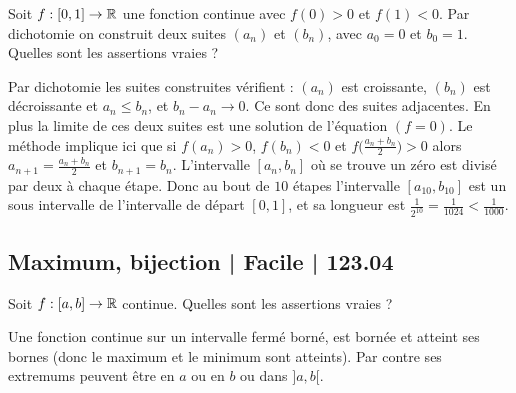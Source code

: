 \begin{question}
Soit $f : [0,1] \to \mathbb{R}$ une fonction continue avec $f(0)>0$ et $f(1)<0$.
Par dichotomie on construit deux suites $(a_n)$ et $(b_n)$, avec $a_0 = 0$ et $b_0 = 1$. Quelles sont les assertions vraies ?
\begin{answers}



    
\end{answers}
\begin{explanations}
Par dichotomie les suites construites vérifient : $(a_n)$ est croissante, $(b_n)$ est décroissante et $a_n \le b_n$, et $b_n-a_n \to 0$. Ce sont donc des suites adjacentes. En plus la limite de ces deux suites est une solution de l'équation $(f=0)$.
Le méthode implique ici que si $f(a_n)>0$, $f(b_n)<0$ et $f\big(\frac{a_n+b_n}{2}\big) >0$ alors $a_{n+1} =\frac{a_n+b_n}{2}$ et $b_{n+1}=b_n$.
L'intervalle $[a_n,b_n]$ où se trouve un zéro est divisé par deux à chaque étape. Donc au bout de $10$ étapes l'intervalle
$[a_{10},b_{10}]$ est un sous intervalle de l'intervalle de départ $[0,1]$, et sa longueur est $\frac{1}{2^{10}} = \frac{1}{1024} < \frac1{1000}$.
\end{explanations}
\end{question}



\subsection{Maximum, bijection | Facile | 123.04}


\begin{question}
Soit $f : [a,b] \to \mathbb{R}$ continue. Quelles sont les assertions vraies ?
\begin{answers}
    \bad{$f$ admet un maximum sur $]a,b[$.}


    \good{$f$ est bornée sur $]a,b[$.}

\end{answers}
\begin{explanations}
Une fonction continue sur un intervalle fermé borné, est bornée et atteint ses bornes (donc le maximum et le minimum sont atteints). Par contre ses extremums peuvent être en $a$ ou en $b$ ou dans $]a,b[$.
\end{explanations}
\end{question}


